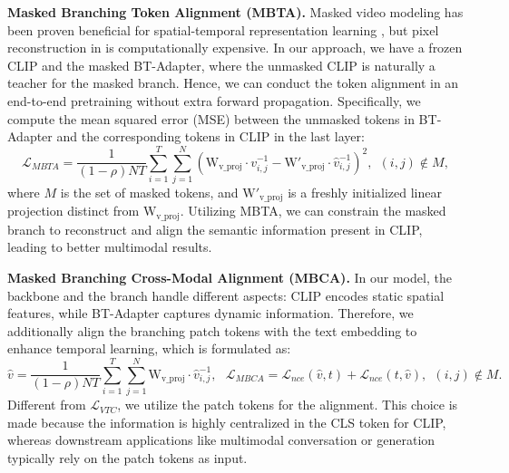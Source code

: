 \documentclass{article} \usepackage{iclr2024_conference,times}
\begin{document}
\noindent \textbf{Masked Branching Token Alignment (MBTA).} 
Masked video modeling has been proven beneficial for spatial-temporal representation learning \citep{tong2022videomae}, but pixel reconstruction in \citet{tong2022videomae} is computationally expensive. In our approach, we have a frozen CLIP and the masked BT-Adapter, where the unmasked CLIP is naturally a teacher for the masked branch. Hence, we can conduct the token alignment in an end-to-end pretraining without extra forward propagation. 
Specifically, we compute the mean squared error (MSE) between the unmasked tokens in BT-Adapter and the corresponding tokens in CLIP in the last layer:
\begin{equation}
     \mathcal{L}_{MBTA} =  \frac{1}{(1-\rho) N T} \sum_{i=1}^{T} \sum_{j=1}^{N} ( \mathrm{W_{v\_proj}} \cdot v_{i,j}^{-1} - \mathrm{W'_{v\_proj}} \cdot \hat{v}_{i,j}^{-1})^2, ~~(i,j) \notin M,
 \end{equation}
 where $M$ is the set of masked tokens, and $\mathrm{W'_{v\_proj}}$ is a freshly initialized linear projection distinct from $\mathrm{W_{v\_proj}}$. Utilizing MBTA, we can constrain the masked branch to reconstruct and align the semantic information present in CLIP, leading to better multimodal results.

 \noindent \textbf{Masked Branching Cross-Modal Alignment (MBCA).} 
In our model, the backbone and the branch handle different aspects: CLIP encodes static spatial features, while BT-Adapter captures dynamic information. Therefore, we additionally align the branching patch tokens with the text embedding to enhance temporal learning, which is formulated as:
\begin{equation}
     \hat{v} = \frac{1}{(1-\rho) N T} \sum_{i=1}^{T} \sum_{j=1}^{N} \mathrm{W_{v\_proj}} \cdot \hat{v}_{i,j}^{-1}, ~~~
     \mathcal{L}_{MBCA} = \mathcal{L}_{nce}(\hat{v},t) + \mathcal{L}_{nce}(t,\hat{v}), ~~(i,j) \notin M.
 \end{equation}
Different from $\mathcal{L}_{VTC}$, we utilize the patch tokens for the alignment. This choice is made because the information is highly centralized in the CLS token for CLIP, whereas downstream applications like multimodal conversation or generation typically rely on the patch tokens as input.
\end{document}

